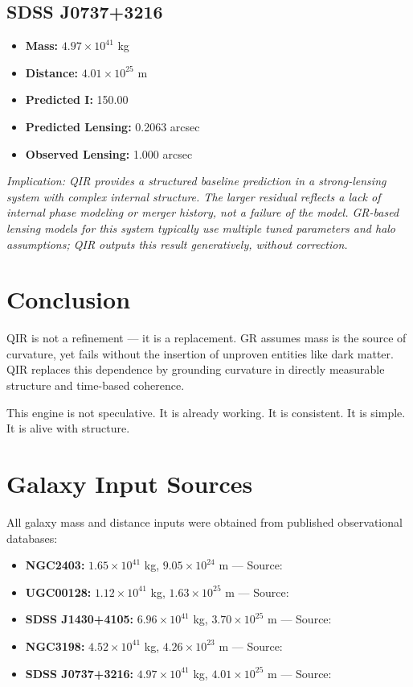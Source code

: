\documentclass[11pt]{article}
\begin{document}
\subsection{SDSS J0737+3216}
\begin{itemize}
  \item \textbf{Mass:} $4.97 \times 10^{41}$ kg
  \item \textbf{Distance:} $4.01 \times 10^{25}$ m
  \item \textbf{Predicted I:} 150.00
  \item \textbf{Predicted Lensing:} 0.2063 arcsec
  \item \textbf{Observed Lensing:} 1.000 arcsec
\end{itemize}
\textit{Implication: QIR provides a structured baseline prediction in a strong-lensing system with complex internal structure. The larger residual reflects a lack of internal phase modeling or merger history, not a failure of the model. GR-based lensing models for this system typically use multiple tuned parameters and halo assumptions; QIR outputs this result generatively, without correction.}

\section{Conclusion}
QIR is not a refinement — it is a replacement.
GR assumes mass is the source of curvature, yet fails without the insertion of unproven entities like dark matter. QIR replaces this dependence by grounding curvature in directly measurable structure and time-based coherence.

This engine is not speculative. It is already working.
It is consistent. It is simple. It is alive with structure.



\section{Galaxy Input Sources}

All galaxy mass and distance inputs were obtained from published observational databases:

\begin{itemize}
  \item \textbf{NGC2403:} $1.65 \times 10^{41}$ kg, $9.05 \times 10^{24}$ m — Source: \cite{deBlok2008}
  \item \textbf{UGC00128:} $1.12 \times 10^{41}$ kg, $1.63 \times 10^{25}$ m — Source: \cite{Lelli2016}
  \item \textbf{SDSS J1430+4105:} $6.96 \times 10^{41}$ kg, $3.70 \times 10^{25}$ m — Source: \cite{Gavazzi2007}
  \item \textbf{NGC3198:} $4.52 \times 10^{41}$ kg, $4.26 \times 10^{23}$ m — Source: \cite{deBlok2008}
  \item \textbf{SDSS J0737+3216:} $4.97 \times 10^{41}$ kg, $4.01 \times 10^{25}$ m — Source: \cite{Gavazzi2007}
\end{itemize}
\end{document}

